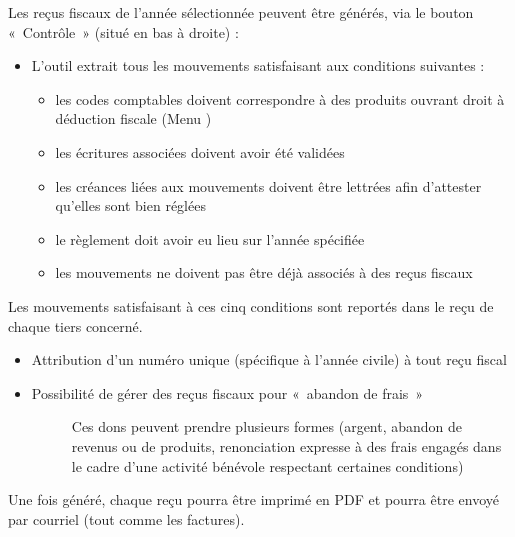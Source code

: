 \documentclass[a4paper,10pt,oneside,french]{sphinxmanual}
\begin{document}
\sphinxAtStartPar
Les reçus fiscaux de l’année sélectionnée peuvent être générés, via le bouton « Contrôle » (situé en bas à droite) :
\begin{itemize}
\item {} 
\sphinxAtStartPar
L’outil extrait tous les mouvements satisfaisant aux conditions suivantes :
\begin{itemize}
\item {} 
\sphinxAtStartPar
les codes comptables doivent correspondre à des produits ouvrant droit à déduction fiscale (Menu )

\item {} 
\sphinxAtStartPar
les écritures associées doivent avoir été validées

\item {} 
\sphinxAtStartPar
les créances liées aux mouvements doivent être lettrées afin d’attester qu’elles sont bien réglées

\item {} 
\sphinxAtStartPar
le règlement doit avoir eu lieu sur l’année spécifiée

\item {} 
\sphinxAtStartPar
les mouvements ne doivent pas être déjà associés à des reçus fiscaux

\end{itemize}

\end{itemize}

\sphinxAtStartPar
Les mouvements satisfaisant à ces cinq conditions sont reportés dans le reçu de chaque tiers concerné.
\begin{itemize}
\item {} 
\sphinxAtStartPar
Attribution d’un numéro unique (spécifique à l’année civile) à tout reçu fiscal

\item {} \begin{description}
\item[{Possibilité de gérer des reçus fiscaux pour « abandon de frais »}] \leavevmode
\sphinxAtStartPar
Ces dons peuvent prendre plusieurs formes (argent, abandon de revenus ou de produits, renonciation expresse à des frais engagés dans le cadre d’une activité bénévole respectant certaines conditions)

\end{description}

\end{itemize}

\sphinxAtStartPar
Une fois généré, chaque reçu pourra être imprimé en PDF et pourra être envoyé par courriel (tout comme les factures).
\end{document}
